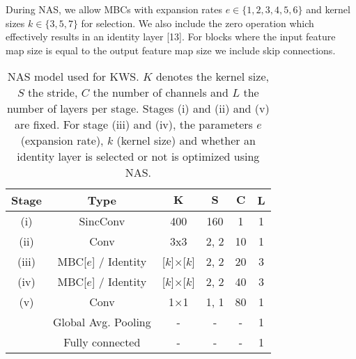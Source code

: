 \documentclass[a4paper]{article}
\begin{document}
During NAS, we allow MBCs with expansion rates $e \in \{1,2,3,4,5,6\}$ and kernel sizes $k \in \{3,5,7\}$ for selection. We also include the zero operation which effectively results in an identity layer [13]. For blocks where the input feature map size is equal to the output feature map size we include skip connections.

\begin{table}[t!]
	\caption{NAS model used for KWS. $K$ denotes the kernel size, $S$ the stride, $C$ the number of channels and $L$ the number of layers per stage. Stages (i) and (ii) and (v) are fixed. For stage (iii) and (iv), the parameters $e$ (expansion rate), $k$ (kernel size) and whether an identity layer is selected or not is optimized using NAS.}
	\begin{center}
		\begin{tabular}{cccccc}
			\toprule
			\textbf{Stage} & \textbf{Type} & $\textbf{K}$ & $\textbf{S}$ & $\textbf{C}$ & $\textbf{L}$ \\
			\midrule
			(i) & SincConv & 400 & 160 & 1 & 1 \\

			(ii) & Conv & 3x3 & 2, 2 & 10 & 1 \\

			(iii) & MBC[$e$] / Identity & [$k$]$\times$[$k$] & 2, 2 & 20& 3 \\

			(iv) & MBC[$e$] / Identity & [$k$]$\times$[$k$] & 2, 2 & 40 & 3 \\

			(v) & Conv & 1$\times$1 & 1, 1 & 80 & 1 \\
			& Global Avg. Pooling & - & - & - & 1\\
			& Fully connected & - & - & - & 1\\
			\bottomrule
		\end{tabular}
	\end{center}
	\label{model_structure}
\end{table}
\end{document}
